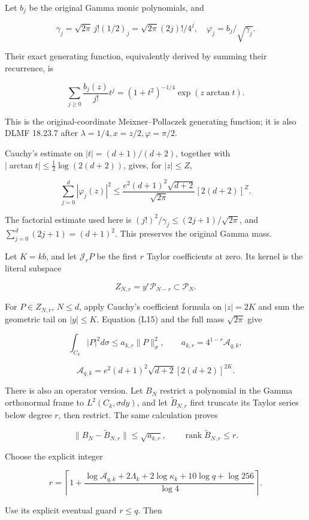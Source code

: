 Let \(b_j\) be the original Gamma monic polynomials, and

\[
\gamma_j=\sqrt{2\pi}\,j!(1/2)_j
=\sqrt{2\pi}(2j)!/4^j,\quad \varphi_j=b_j/\sqrt{\gamma_j}.
\]

Their exact generating function, equivalently derived by summing their recurrence, is

\[
\sum_{j\ge0}\frac{b_j(z)}{j!}t^j
=(1+t^2)^{-1/4}\exp(z\arctan t).
\tag{L14}
\]

This is the original-coordinate Meixner--Pollaczek generating function; it is also DLMF 18.23.7 after \(\lambda=1/4,x=z/2,\varphi=\pi/2\).

Cauchy's estimate on \(|t|=(d+1)/(d+2)\), together with
\(|\arctan t|\le\frac12\log(2(d+2))\), gives, for \(|z|\le Z\),

\[
\sum_{j=0}^d|\varphi_j(z)|^2
\le\frac{e^2(d+1)^2\sqrt{d+2}}{\sqrt{2\pi}}
[2(d+2)]^Z.
\tag{L15}
\]

The factorial estimate used here is
\((j!)^2/\gamma_j\le(2j+1)/\sqrt{2\pi}\), and
\(\sum_{j=0}^d(2j+1)=(d+1)^2\). This preserves the original Gamma mass.

Let \(K=kb\), and let \(\mathcal J_rP\) be the first \(r\) Taylor coefficients at zero. Its kernel is the literal subspace

\[
Z_{N,r}=y^r\mathcal P_{N-r}\subset\mathcal P_N.
\tag{L16}
\]

For \(P\in Z_{N,r}\), \(N\le d\), apply Cauchy's coefficient formula on \(|z|=2K\) and sum the geometric tail on \(|y|\le K\). Equation (L15) and the full mass \(\sqrt{2\pi}\) give

\[
\boxed{\int_{C_k}|P|^2d\sigma\le a_{k,r}\|P\|_\sigma^2,\qquad
 a_{k,r}=4^{1-r}\mathcal A_{q,k},}
\tag{L17}
\]

\[
\mathcal A_{q,k}=e^2(d+1)^2\sqrt{d+2}[2(d+2)]^{2K}.
\]

There is also an operator version. Let \(B_N\) restrict a polynomial in the Gamma orthonormal frame to \(L^2(C_k,\sigma dy)\), and let \(\widetilde B_{N,r}\) first truncate its Taylor series below degree \(r\), then restrict. The same calculation proves

\[
\|B_N-\widetilde B_{N,r}\|\le\sqrt{a_{k,r}},\qquad
\operatorname{rank}\widetilde B_{N,r}\le r.
\tag{L18}
\]

Choose the explicit integer

\[
\boxed{r=\left\lceil 1+
\frac{\log\mathcal A_{q,k}+2\Lambda_k+2\log\kappa_k
+10\log q+\log256}{\log4}\right\rceil.}
\tag{L19}
\]

Use its explicit eventual guard \(r\le q\). Then

